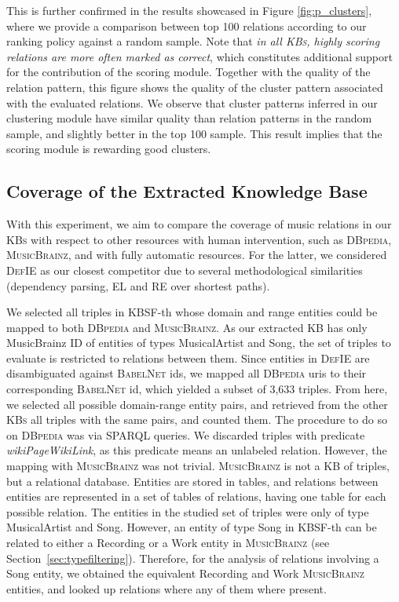 This is further confirmed in the results showcased in Figure \ref{fig:p_clusters}, where we provide a comparison between top 100 relations according to our ranking policy against a random sample. Note that \textit{in all \textsc{KBs}, highly scoring relations are more often marked as correct}, which constitutes additional support for the contribution of the scoring module. Together with the quality of the relation pattern, this figure shows the quality of the cluster pattern associated with the evaluated relations. We observe that cluster patterns inferred in our clustering module have similar quality than relation patterns in the random sample, and slightly better in the top 100 sample. This result implies that the scoring module is rewarding good clusters.

\subsection{Coverage of the Extracted Knowledge Base}

With this experiment, we aim to compare the coverage of music relations in our \textsc{KBs} with respect to other resources with human intervention, such as \textsc{DBpedia}, \textsc{MusicBrainz}, and with fully automatic resources. For the latter, we considered \textsc{DefIE} as our closest competitor due to several methodological similarities (dependency parsing, \textsc{EL} and \textsc{RE} over shortest paths). 

We selected all triples in \textsc{KBSF}-th whose domain and range entities could be mapped to both \textsc{DBpedia} and \textsc{MusicBrainz}. As our extracted \textsc{KB} has only MusicBrainz ID of entities of types MusicalArtist and Song, the set of triples to evaluate is restricted to relations between them. Since entities in \textsc{DefIE} are disambiguated against \textsc{BabelNet} ids, we mapped all \textsc{DBpedia} uris to their corresponding \textsc{BabelNet} id, which yielded a subset of 3,633 triples. From here, we selected all possible domain-range entity pairs, and retrieved from the other \textsc{KBs} all triples with the same pairs, and counted them.
The procedure to do so on \textsc{DBpedia} was via SPARQL queries.
We discarded triples with predicate \textit{wikiPageWikiLink}, as this predicate means an unlabeled relation. However, the mapping with \textsc{MusicBrainz} was not trivial. \textsc{MusicBrainz} is not a \textsc{KB} of triples, but a relational database. Entities are stored in tables, and relations between entities are represented in a set of tables of relations, having one table for each possible relation. The entities in the studied set of triples were only of type MusicalArtist and Song. However, an entity of type Song in \textsc{KBSF}-th can be related to either a Recording or a Work entity in \textsc{MusicBrainz} (see Section~\ref{sec:typefiltering}). Therefore, for the analysis of relations involving a Song entity, we obtained the equivalent Recording and Work \textsc{MusicBrainz} entities, and looked up relations where any of them where present.

